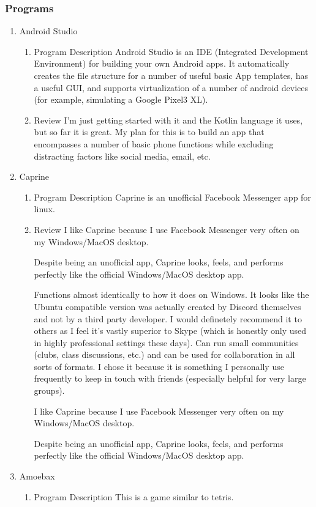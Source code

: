 \documentclass{article}
\begin{document}
\subsubsection{Programs}
\label{sec:orgec3ce1e}
\begin{enumerate}
\item Android Studio
\label{sec:org9cfe45a}
\begin{enumerate}
\item Program Description
\label{sec:orge68a0b9}
Android Studio is an IDE (Integrated Development Environment) for building your own Android apps.
It automatically creates the file structure for a number of useful basic App templates, has a useful GUI, and supports virtualization of a number of android devices (for example, simulating a Google Pixel3 XL).
\item Review
\label{sec:orgb85344e}
I'm just getting started with it and the Kotlin language it uses, but so far it is great. My plan for this is to build an app that encompasses a number of basic phone functions while excluding distracting factors like social media, email, etc.
\end{enumerate}
\item Caprine
\label{sec:orga7ee711}
\begin{enumerate}
\item Program Description
\label{sec:org41def90}
Caprine is an unofficial Facebook Messenger app for linux.
\item Review
\label{sec:org200b71d}
I like Caprine because I use Facebook Messenger very often on my Windows/MacOS desktop.

Despite being an unofficial app, Caprine looks, feels, and performs perfectly like the official Windows/MacOS desktop app.

Functions almost identically to how it does on Windows. It looks like the Ubuntu compatible version was actually created by Discord themselves and not by a third party developer. I would definetely recommend it to others as I feel it's vastly superior to Skype (which is honestly only used in highly professional settings these days). Can run small communities (clubs, class discussions, etc.) and can be used for collaboration in all sorts of formats. I chose it because it is something I personally use frequently to keep in touch with friends (especially helpful for very large groups).

I like Caprine because I use Facebook Messenger very often on my Windows/MacOS desktop.

Despite being an unofficial app, Caprine looks, feels, and performs perfectly like the official Windows/MacOS desktop app.
\end{enumerate}
\item Amoebax
\label{sec:orgcfb43cc}
\begin{enumerate}
\item Program Description
\label{sec:orga588d1d}
This is a game similar to tetris.


\end{enumerate}
\end{enumerate}
\end{document}
